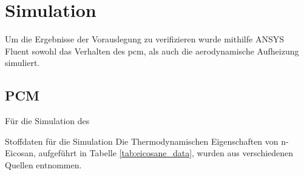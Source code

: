 \chapter{Simulation}\label{chap:Simulation}

Um die Ergebnisse der Vorauslegung zu verifizieren wurde mithilfe ANSYS Fluent sowohl das Verhalten des \ac{pcm}, als auch die
aerodynamische Aufheizung simuliert.

\section{PCM}\label{sec:sim_pcm}

Für die Simulation des 

Stoffdaten für die Simulation
Die Thermodynamischen Eigenschaften von n-Eicosan, aufgeführt in Tabelle \ref{tab:eicosane_data}, wurden aus verschiedenen Quellen entnommen.

